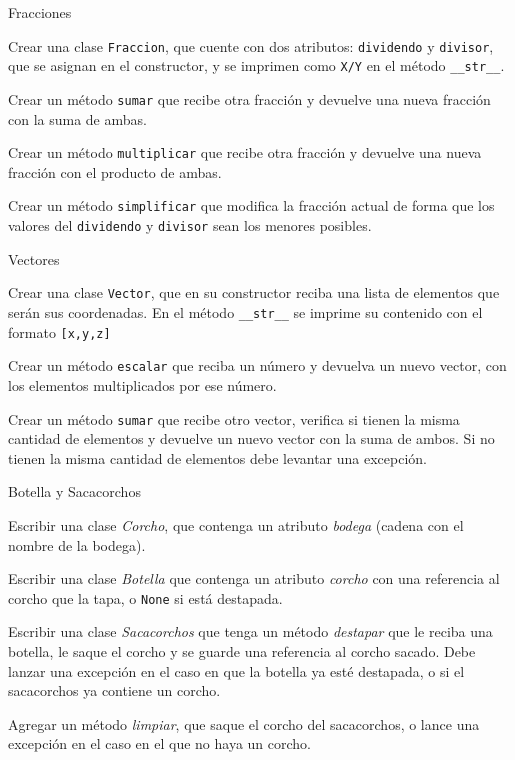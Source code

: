 \begin{ejercicio}
Fracciones
\begin{partes}
    \item Crear una clase \verb!Fraccion!, que cuente con dos atributos:
\verb!dividendo! y \verb!divisor!, que se asignan en el constructor, y se
imprimen como \verb!X/Y! en el método \verb!__str__!.
    \item Crear un método \verb!sumar! que recibe otra fracción y devuelve una
nueva fracción con la suma de ambas.
    \item Crear un método \verb!multiplicar! que recibe otra fracción y
devuelve una nueva fracción con el producto de ambas.
    \item Crear un método \verb!simplificar! que modifica la fracción actual de
forma que los valores del \verb!dividendo! y \verb!divisor! sean los
menores posibles.
\end{partes}
\end{ejercicio}


\begin{ejercicio}
Vectores
\begin{partes}
    \item Crear una clase \verb!Vector!, que en su constructor reciba una lista
de elementos que serán sus coordenadas.  En el método \verb!__str__! se
imprime su contenido con el formato \verb![x,y,z]!
    \item Crear un método \verb!escalar! que reciba un número y devuelva un
nuevo vector, con los elementos multiplicados por ese número.
    \item Crear un método \verb!sumar! que recibe otro vector, verifica si
tienen la misma cantidad de elementos y devuelve un nuevo vector con la
suma de ambos.  Si no tienen la misma cantidad de elementos debe levantar
una excepción.
\end{partes}
\end{ejercicio}


\begin{ejercicio}
Botella y Sacacorchos
\begin{partes}
    \item Escribir una clase {\it Corcho}, que contenga un atributo {\it
bodega} (cadena con el nombre de la bodega).
    \item Escribir una clase {\it Botella} que contenga un atributo {\it
corcho} con una referencia al corcho que la tapa, o \verb!None! si está
destapada.
    \item Escribir una clase {\it Sacacorchos} que tenga un método {\it
destapar} que le reciba una botella, le saque el corcho y se guarde una
referencia al corcho sacado.  Debe lanzar una excepción en el caso en que
la botella ya esté destapada, o si el sacacorchos ya contiene un corcho.
    \item Agregar un método {\it limpiar}, que saque el corcho del sacacorchos,
o lance una excepción en el caso en el que no haya un corcho.
\end{partes}
\end{ejercicio}


